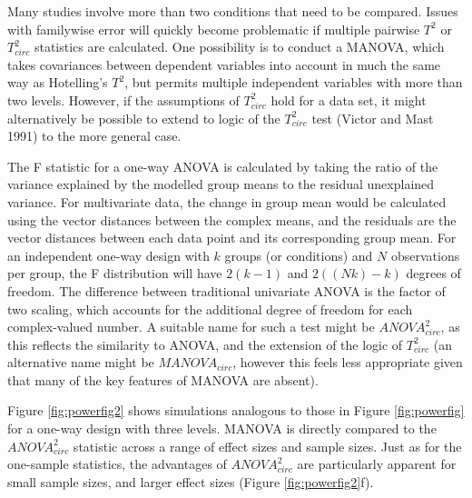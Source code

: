 \documentclass[]{article}
\begin{document}
Many studies involve more than two conditions that need to be compared. Issues with familywise error will quickly become problematic if multiple pairwise \(T^2\) or \(T^2_{circ}\) statistics are calculated. One possibility is to conduct a MANOVA, which takes covariances between dependent variables into account in much the same way as Hotelling's \(T^2\), but permits multiple independent variables with more than two levels. However, if the assumptions of \(T^2_{circ}\) hold for a data set, it might alternatively be possible to extend to logic of the \(T^2_{circ}\) test (Victor and Mast 1991) to the more general case.

The F statistic for a one-way ANOVA is calculated by taking the ratio of the variance explained by the modelled group means to the residual unexplained variance. For multivariate data, the change in group mean would be calculated using the vector distances between the complex means, and the residuals are the vector distances between each data point and its corresponding group mean. For an independent one-way design with \(k\) groups (or conditions) and \(N\) observations per group, the F distribution will have \(2(k-1)\) and \(2((Nk)-k)\) degrees of freedom. The difference between traditional univariate ANOVA is the factor of two scaling, which accounts for the additional degree of freedom for each complex-valued number. A suitable name for such a test might be \({ANOVA}^2_{circ}\), as this reflects the similarity to ANOVA, and the extension of the logic of \(T^2_{circ}\) (an alternative name might be \(MANOVA_{circ}\), however this feels less appropriate given that many of the key features of MANOVA are absent).

Figure \ref{fig:powerfig2} shows simulations analogous to those in Figure \ref{fig:powerfig} for a one-way design with three levels. MANOVA is directly compared to the \({ANOVA}^2_{circ}\) statistic across a range of effect sizes and sample sizes. Just as for the one-sample statistics, the advantages of \({ANOVA}^2_{circ}\) are particularly apparent for small sample sizes, and larger effect sizes (Figure \ref{fig:powerfig2}f).
\end{document}
